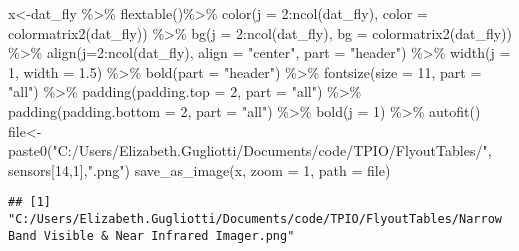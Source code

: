 \documentclass[
]{article}
\newenvironment{Shaded}{\begin{snugshade}}{\end{snugshade}}
\newcommand{\AttributeTok}[1]{\textcolor[rgb]{0.77,0.63,0.00}{#1}}
\newcommand{\DecValTok}[1]{\textcolor[rgb]{0.00,0.00,0.81}{#1}}
\newcommand{\FloatTok}[1]{\textcolor[rgb]{0.00,0.00,0.81}{#1}}
\newcommand{\FunctionTok}[1]{\textcolor[rgb]{0.00,0.00,0.00}{#1}}
\newcommand{\NormalTok}[1]{#1}
\newcommand{\OtherTok}[1]{\textcolor[rgb]{0.56,0.35,0.01}{#1}}
\newcommand{\SpecialCharTok}[1]{\textcolor[rgb]{0.00,0.00,0.00}{#1}}
\newcommand{\StringTok}[1]{\textcolor[rgb]{0.31,0.60,0.02}{#1}}
\begin{document}
\begin{Shaded}
\begin{Highlighting}[]
\NormalTok{x}\OtherTok{\textless{}{-}}\NormalTok{dat\_fly }\SpecialCharTok{\%\textgreater{}\%}
    \FunctionTok{flextable}\NormalTok{()}\SpecialCharTok{\%\textgreater{}\%}
    \FunctionTok{color}\NormalTok{(}\AttributeTok{j =} \DecValTok{2}\SpecialCharTok{:}\FunctionTok{ncol}\NormalTok{(dat\_fly), }\AttributeTok{color =} \FunctionTok{colormatrix2}\NormalTok{(dat\_fly)) }\SpecialCharTok{\%\textgreater{}\%}
    \FunctionTok{bg}\NormalTok{(}\AttributeTok{j =} \DecValTok{2}\SpecialCharTok{:}\FunctionTok{ncol}\NormalTok{(dat\_fly), }\AttributeTok{bg =} \FunctionTok{colormatrix2}\NormalTok{(dat\_fly)) }\SpecialCharTok{\%\textgreater{}\%}
    \FunctionTok{align}\NormalTok{(}\AttributeTok{j=}\DecValTok{2}\SpecialCharTok{:}\FunctionTok{ncol}\NormalTok{(dat\_fly), }\AttributeTok{align =} \StringTok{"center"}\NormalTok{, }\AttributeTok{part =} \StringTok{"header"}\NormalTok{) }\SpecialCharTok{\%\textgreater{}\%}
    \FunctionTok{width}\NormalTok{(}\AttributeTok{j =} \DecValTok{1}\NormalTok{, }\AttributeTok{width =} \FloatTok{1.5}\NormalTok{) }\SpecialCharTok{\%\textgreater{}\%}
    \FunctionTok{bold}\NormalTok{(}\AttributeTok{part =} \StringTok{"header"}\NormalTok{) }\SpecialCharTok{\%\textgreater{}\%}
    \FunctionTok{fontsize}\NormalTok{(}\AttributeTok{size =} \DecValTok{11}\NormalTok{, }\AttributeTok{part =} \StringTok{"all"}\NormalTok{) }\SpecialCharTok{\%\textgreater{}\%}
    \FunctionTok{padding}\NormalTok{(}\AttributeTok{padding.top =} \DecValTok{2}\NormalTok{, }\AttributeTok{part =} \StringTok{"all"}\NormalTok{) }\SpecialCharTok{\%\textgreater{}\%}
    \FunctionTok{padding}\NormalTok{(}\AttributeTok{padding.bottom =} \DecValTok{2}\NormalTok{, }\AttributeTok{part =} \StringTok{"all"}\NormalTok{) }\SpecialCharTok{\%\textgreater{}\%}
    \FunctionTok{bold}\NormalTok{(}\AttributeTok{j =} \DecValTok{1}\NormalTok{) }\SpecialCharTok{\%\textgreater{}\%} \FunctionTok{autofit}\NormalTok{()}
\NormalTok{file}\OtherTok{\textless{}{-}}\FunctionTok{paste0}\NormalTok{(}\StringTok{"C:/Users/Elizabeth.Gugliotti/Documents/code/TPIO/FlyoutTables/"}\NormalTok{, sensors[}\DecValTok{14}\NormalTok{,}\DecValTok{1}\NormalTok{],}\StringTok{".png"}\NormalTok{)}
\FunctionTok{save\_as\_image}\NormalTok{(x, }\AttributeTok{zoom =} \DecValTok{1}\NormalTok{, }\AttributeTok{path =}\NormalTok{ file)}
\end{Highlighting}
\end{Shaded}

\begin{verbatim}
## [1] "C:/Users/Elizabeth.Gugliotti/Documents/code/TPIO/FlyoutTables/Narrow Band Visible & Near Infrared Imager.png"
\end{verbatim}
\end{document}

